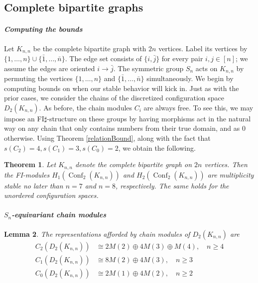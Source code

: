 \documentclass[12pt]{amsart}
\newtheorem{thm}{Theorem}[section]
\newtheorem{lem}[thm]{Lemma}
\theoremstyle{definition}
\newcommand{\conf}{\operatorname{Conf}}
\begin{document}
\subsection{Complete bipartite graphs}

\paragraph{\textit{Computing the bounds}}
Let $K_{n,n}$ be the complete bipartite graph with $2n$ vertices. Label its vertices by $\{1,\dots,n\} \cup\{\bar 1,\dots,\bar n\}$. The edge set consists of $\{i,\bar j\}$ for every pair $i,j\in [n]$; we assume the edges are oriented $i\to \bar j$. The symmetric group $S_n$ acts on $K_{n,n}$ by permuting the vertices $\{1,\dots,n\}$ and $\{\bar1,\dots,\bar n\}$ simultaneously. We begin by computing bounds on when our stable behavior will kick in. Just as with the prior cases, we consider the chains of the discretized configuration space $D_2(K_{n,n})$. As before, the chain modules $C_i$ are always free. To see this, we may impose an FI$\sharp$-structure on these groups by having morphisms act in the natural way on any chain that only contains numbers from their true domain, and as 0 otherwise. Using Theorem \ref{relationBound}, along with the fact that $s(C_2) = 4, s(C_1) = 3, s(C_0) = 2$, we obtain the following.

\begin{thm} \label{completebipartiteBound}
Let $K_{n,n}$ denote the complete bipartite graph on $2n$ vertices. Then the FI-modules $H_1(\conf_2(K_{n,n}))$ and $H_2(\conf_2(K_{n,n}))$ are multiplicity stable no later than $n = 7$ and $n = 8$, respectively. The same holds for the unordered configuration spaces.
\end{thm}

\paragraph{\textit{$S_n$-equivariant chain modules}}

\begin{lem}
The representations afforded by chain modules of $D_2(K_{n,n})$ are
\begin{align*}
C_2(D_2(K_{n,n})) &\cong 2M(2) \oplus 4M(3) \oplus M(4),\quad n\geq 4\\
C_1(D_2(K_{n,n})) &\cong 8M(2) \oplus 4M(3),\quad n\geq 3\\
C_0(D_2(K_{n,n})) &\cong 2M(1) \oplus 4M(2),\quad n\geq 2 
\end{align*}
\end{lem}
\end{document}
